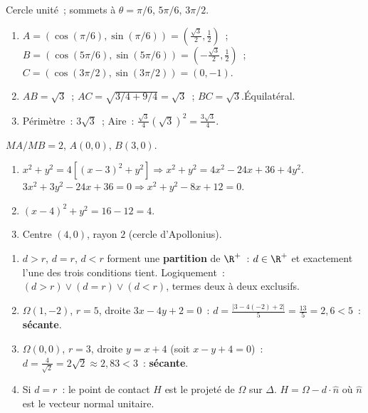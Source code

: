
Cercle unit\'e~; sommets \`a $\theta=\pi/6$, $5\pi/6$, $3\pi/2$.
\begin{enumerate}
  \item $A=(\cos(\pi/6),\sin(\pi/6))=(\frac{\sqrt{3}}{2},\frac{1}{2})$~;
        $B=(\cos(5\pi/6),\sin(5\pi/6))=(-\frac{\sqrt{3}}{2},\frac{1}{2})$~;
        $C=(\cos(3\pi/2),\sin(3\pi/2))=(0,-1)$.
  \item $AB=\sqrt{3}$~; $AC=\sqrt{3/4+9/4}=\sqrt{3}$~; $BC=\sqrt{3}$.\checkmark\quad \'Equilat\'eral.
  \item P\'erim\`etre~: $3\sqrt{3}$~; Aire~: $\frac{\sqrt{3}}{4}(\sqrt{3})^2=\frac{3\sqrt{3}}{4}$.
\end{enumerate}


$MA/MB=2$, $A(0,0)$, $B(3,0)$.
\begin{enumerate}
  \item $x^2+y^2=4[(x-3)^2+y^2]\Rightarrow x^2+y^2=4x^2-24x+36+4y^2$.
        $3x^2+3y^2-24x+36=0\Rightarrow x^2+y^2-8x+12=0$.
  \item $(x-4)^2+y^2=16-12=4$.
  \item Centre $(4,0)$, rayon $2$ (cercle d'Apollonius).
\end{enumerate}


\begin{enumerate}
  \item $d>r$, $d=r$, $d<r$ forment une \textbf{partition} de $\R^+$~:
        $d\in\R^+$ et exactement l'une des trois conditions tient.
        Logiquement~: $(d>r)\vee(d=r)\vee(d<r)$, termes deux \`a deux exclusifs.
  \item $\Omega(1,-2)$, $r=5$, droite $3x-4y+2=0$~:
        $d=\frac{|3-4(-2)+2|}{5}=\frac{13}{5}=2{,}6<5$~: \textbf{s\'ecante}.
  \item $\Omega(0,0)$, $r=3$, droite $y=x+4$ (soit $x-y+4=0$)~:
        $d=\frac{4}{\sqrt{2}}=2\sqrt{2}\approx2{,}83<3$~: \textbf{s\'ecante}.
  \item Si $d=r$~: le point de contact $H$ est le projet\'e de $\Omega$ sur $\Delta$.
        $H=\Omega-d\cdot\hat{n}$ o\`u $\hat{n}$ est le vecteur normal unitaire.
\end{enumerate}

